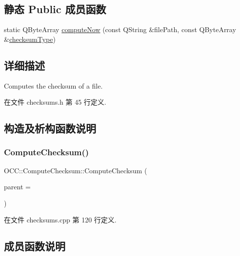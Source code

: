 \subsection*{静态 Public 成员函数}
\begin{DoxyCompactItemize}
\item 
static Q\+Byte\+Array \hyperlink{class_o_c_c_1_1_compute_checksum_a67b5ce48ee0cca21cbe48a34b8fb9dd8}{compute\+Now} (const Q\+String \&file\+Path, const Q\+Byte\+Array \&\hyperlink{class_o_c_c_1_1_compute_checksum_a7eccc42b0c561aebf5920a47b4cf0d74}{checksum\+Type})
\end{DoxyCompactItemize}


\subsection{详细描述}
Computes the checksum of a file. 

在文件 checksums.\+h 第 45 行定义.



\subsection{构造及析构函数说明}
\mbox{\label{class_o_c_c_1_1_compute_checksum_a6b1e2c90eda442c669e1c1c39a4e0871}} 
\subsubsection{\texorpdfstring{Compute\+Checksum()}{ComputeChecksum()}}
{\footnotesize\ttfamily O\+C\+C\+::\+Compute\+Checksum\+::\+Compute\+Checksum (\begin{DoxyParamCaption}\item[{Q\+Object $\ast$}]{parent = {} }\end{DoxyParamCaption})\hspace{0.3cm}{\ttfamily [explicit]}}



在文件 checksums.\+cpp 第 120 行定义.



\subsection{成员函数说明}
\mbox{\label{class_o_c_c_1_1_compute_checksum_a7eccc42b0c561aebf5920a47b4cf0d74}} 
